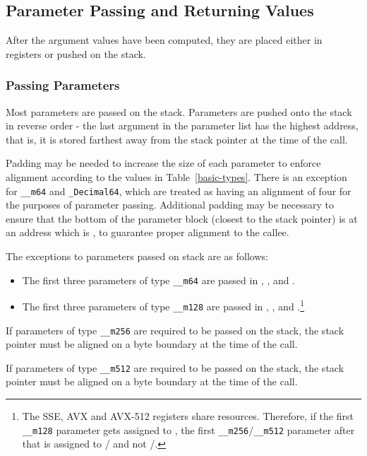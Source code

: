 \subsection{Parameter Passing and Returning Values}
\label{sec-calling-conventions}

After the argument values have been computed, they are placed either in
registers or pushed on the stack.

\subsubsection{Passing Parameters}

Most parameters are passed on the stack. Parameters are pushed onto the
stack in reverse order - the last argument in the parameter list has the
highest address, that is, it is stored farthest away from the stack pointer
at the time of the call.

Padding may be needed to increase the size of each parameter to enforce
alignment according to the values in Table~\ref{basic-types}.  There is
an exception for \texttt{__m64} and \texttt{_Decimal64}, which are treated
as having an
alignment of four for the purposes of parameter passing.  Additional
padding may be necessary to ensure that the bottom of the parameter block
(closest to the stack pointer) is at an address which is ,
to guarantee proper alignment to the callee.

The exceptions to parameters passed on stack are as follows:
\begin{itemize}
  \item The first three parameters of type \texttt{__m64} are passed in
	, , and .
  \item The first three parameters of type \texttt{__m128} are passed in
	, , and .\footnote{The SSE, AVX
	and AVX-512 registers share resources. Therefore, if the first
	\texttt{__m128} parameter gets assigned to  , the
	first \texttt{__m256}/\texttt{__m512} parameter after that is
	assigned to / and not
	/.}
\end{itemize}

If parameters of type \texttt{__m256} are required to be passed on the
stack, the stack pointer must be aligned on a  byte boundary
at the time of the call.

If parameters of type \texttt{__m512} are required to be passed on the
stack, the stack pointer must be aligned on a  byte boundary
at the time of the call.

